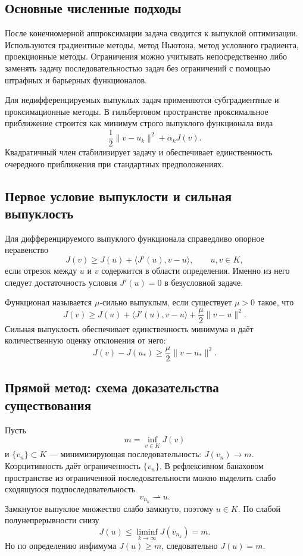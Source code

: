 \subsection{Основные численные подходы}

После конечномерной аппроксимации задача сводится к выпуклой оптимизации.
Используются градиентные методы, метод Ньютона, метод условного градиента,
проекционные методы. Ограничения можно учитывать непосредственно либо заменять
задачу последовательностью задач без ограничений с помощью штрафных и
барьерных функционалов.

Для недифференцируемых выпуклых задач применяются субградиентные и
проксимационные методы. В гильбертовом пространстве проксимальное приближение
строится как минимум строго выпуклого функционала вида
\[
    \frac12\|v-u_k\|^2+\alpha_k J(v).
\]
Квадратичный член стабилизирует задачу и обеспечивает единственность очередного
приближения при стандартных предположениях.


\subsection{Первое условие выпуклости и сильная выпуклость}

Для дифференцируемого выпуклого функционала справедливо опорное неравенство
\[
    J(v)\ge J(u)+\langle J'(u),v-u\rangle,
    \qquad u,v\in K,
\]
если отрезок между $u$ и $v$ содержится в области определения. Именно из него
следует достаточность условия $J'(u)=0$ в безусловной задаче.

Функционал называется $\mu$-сильно выпуклым, если существует $\mu>0$ такое, что
\[
J(v)\ge J(u)+\langle J'(u),v-u\rangle
      +\frac{\mu}{2}\|v-u\|^2.
\]
Сильная выпуклость обеспечивает единственность минимума и даёт количественную
оценку отклонения от него:
\[
    J(v)-J(u_*)\ge \frac{\mu}{2}\|v-u_*\|^2.
\]

\subsection{Прямой метод: схема доказательства существования}

Пусть
\[
    m=\inf_{v\in K}J(v)
\]
и $\{v_n\}\subset K$ --- минимизирующая последовательность: $J(v_n)\to m$.
Коэрцитивность даёт ограниченность $\{v_n\}$. В рефлексивном банаховом
пространстве из ограниченной последовательности можно выделить слабо сходящуюся
подпоследовательность
\[
    v_{n_k}\rightharpoonup u.
\]
Замкнутое выпуклое множество слабо замкнуто, поэтому $u\in K$. По слабой
полунепрерывности снизу
\[
    J(u)\le \liminf_{k\to\infty}J(v_{n_k})=m.
\]
Но по определению инфимума $J(u)\ge m$, следовательно $J(u)=m$.

